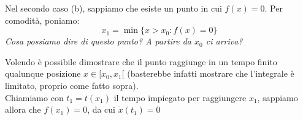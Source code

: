 \documentclass[11pt,a4paper,twoside]{article}
\theoremstyle{definition}
\begin{document}
Nel secondo caso (b), sappiamo che esiste un punto in cui $f(x) = 0$. Per comodità, poniamo:
\[ x_1 = \min\{ x>x_0: f(x)=0 \} \]
\textit{Cosa possiamo dire di questo punto? A partire da $x_0$ ci arriva?}
\begin{center}
\end{center}
Volendo è possibile dimostrare che il punto raggiunge in un tempo finito qualunque posizione $x \in [x_0,x_1[$ (basterebbe infatti mostrare che l'integrale è limitato, proprio come fatto sopra).\\
Chiamiamo con $t_1 = t(x_1)$ il tempo impiegato per raggiungere $x_1$, sappiamo allora che $f(x_1) = 0$, da cui $\dot x(t_1)=0$
\end{document}
